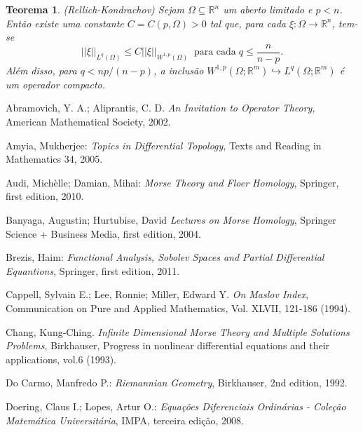\documentclass[12pt]{book}
\newtheorem{teorema}{Teorema}[section]
\newcommand{\espacoLpGeral}[2]{L^{#1}(#2)}
\newcommand{\espacosobolevcontradominio}[2]{W^{1,p}(#1;#2)}
\newcommand{\norma}[1]{||#1||}
\newcommand{\normaLgGeral}[3]{\norma{#1}_{\espacoLpGeral{#2}{#3}}}
\newcommand{\normaWpGeralDominio}[3]{\norma{#1}_{W^{1,#2}(#3)}}
\newcommand{\real}[1]{\mathbb{R}^{#1}}
\begin{document}
	\begin{teorema}\label{teorema_rellich}
		(Rellich-Kondrachov) Sejam $\Omega \subseteq \real{n}$ um aberto limitado e $p<n$. Então existe uma constante $C=C(p,\Omega)>0$ tal que, para cada $\xi: \Omega \to \real{n}$, tem-se 
		$$
		\normaLgGeral{\xi}{q}{\Omega} \leq C \normaWpGeralDominio{\xi}{p}{\Omega}\;\;\text{para cada}\; q\leq \frac{n}{n-p}.
		$$
		Além disso, para $q<np/(n-p)$, a inclusão $\espacosobolevcontradominio{\Omega}{\real{m}} \hookrightarrow \espacoLpGeral{q}{\Omega;\real{m}}$ é um operador compacto.
	\end{teorema}
	
	\begin{thebibliography}{9}
		Abramovich, Y. A.; Aliprantis, C. D.
		\emph{An Invitation to Operator Theory},
		American Mathematical Society, 2002.
		
		Amyia, Mukherjee:
		\emph{Topics in Differential Topology},
		Texts and Reading in Mathematics 34,
		2005.
		
		Audi, Michèlle; Damian, Mihai:
		\emph{Morse Theory and Floer Homology},
		Springer, first edition,
		2010.
		
		Banyaga, Augustin; Hurtubise, David
		\emph{Lectures on Morse Homology},
		Springer Science + Business Media, first edition,
		2004.
		
		Brezis, Haim:
		\emph{Functional Analysis, Sobolev Spaces and Partial Differential Equantions},
		Springer, first edition,
		2011.
		
		Cappell, Sylvain E.; Lee, Ronnie; Miller, Edward Y.
		\emph{On Maslov Index}, Communication on Pure and Applied Mathematics, Vol. XLVII, 121-186 (1994).
		
		Chang, Kung-Ching.
		\emph{Infinite Dimensional Morse Theory and Multiple Solutions Problems}, Birkhauser, Progress in nonlinear differential equations and
		their applications, vol.6 (1993).
		
		Do Carmo, Manfredo P.:
		\emph{Riemannian Geometry},
		Birkhauser, 2nd edition,
		1992.
		
		Doering, Claus I.; Lopes, Artur O.:
		\emph{Equações Diferenciais Ordinárias - Coleção Matemática Universitária},
		IMPA, terceira edição,
		2008.
		

\end{thebibliography}
\end{document}
